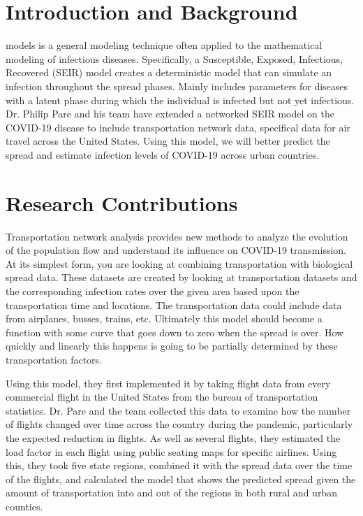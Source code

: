 \documentclass[journal,onecolumn]{IEEEtran}
\begin{document}
\IEEEpeerreviewmaketitle

\section{Introduction and Background}

 models is a general modeling technique often applied to the mathematical modeling of infectious diseases. Specifically, a Susceptible, Exposed, Infectious, Recovered (SEIR) model creates a deterministic model that can simulate an infection throughout the spread phases. Mainly includes parameters for diseases with a latent phase during which the individual is infected but not yet infectious. Dr. Philip Pare and his team have extended a networked SEIR model on the COVID-19 disease to include transportation network data, specifical data for air travel across the United States. Using this model, we will better predict the spread and estimate infection levels of COVID-19 across urban countries. 

\section{Research Contributions}

Transportation network analysis provides new methods to analyze the evolution of the population flow and understand its influence on COVID-19 transmission. At its simplest form, you are looking at combining transportation with biological spread data. These datasets are created by looking at transportation datasets and the corresponding infection rates over the given area based upon the transportation time and locations. The transportation data could include data from airplanes, busses, trains, etc. Ultimately this model should become a function with some curve that goes down to zero when the spread is over. How quickly and linearly this happens is going to be partially determined by these transportation factors. 

Using this model, they first implemented it by taking flight data from every commercial flight in the United States from the bureau of transportation statistics. Dr. Pare and the team collected this data to examine how the number of flights changed over time across the country during the pandemic, particularly the expected reduction in flights. As well as several flights, they estimated the load factor in each flight using public seating maps for specific airlines. Using this, they took five state regions, combined it with the spread data over the time of the flights, and calculated the model that shows the predicted spread given the amount of transportation into and out of the regions in both rural and urban counties. 
\end{document}
